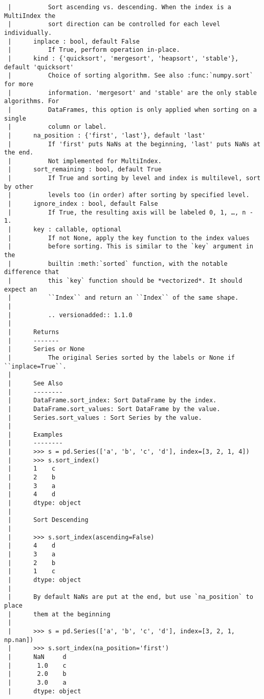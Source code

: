 \documentclass[
  letterpaper,
  DIV=11,
  numbers=noendperiod]{scrreprt}
\begin{document}
\begin{verbatim}
 |          Sort ascending vs. descending. When the index is a MultiIndex the
 |          sort direction can be controlled for each level individually.
 |      inplace : bool, default False
 |          If True, perform operation in-place.
 |      kind : {'quicksort', 'mergesort', 'heapsort', 'stable'}, default 'quicksort'
 |          Choice of sorting algorithm. See also :func:`numpy.sort` for more
 |          information. 'mergesort' and 'stable' are the only stable algorithms. For
 |          DataFrames, this option is only applied when sorting on a single
 |          column or label.
 |      na_position : {'first', 'last'}, default 'last'
 |          If 'first' puts NaNs at the beginning, 'last' puts NaNs at the end.
 |          Not implemented for MultiIndex.
 |      sort_remaining : bool, default True
 |          If True and sorting by level and index is multilevel, sort by other
 |          levels too (in order) after sorting by specified level.
 |      ignore_index : bool, default False
 |          If True, the resulting axis will be labeled 0, 1, …, n - 1.
 |      key : callable, optional
 |          If not None, apply the key function to the index values
 |          before sorting. This is similar to the `key` argument in the
 |          builtin :meth:`sorted` function, with the notable difference that
 |          this `key` function should be *vectorized*. It should expect an
 |          ``Index`` and return an ``Index`` of the same shape.
 |      
 |          .. versionadded:: 1.1.0
 |      
 |      Returns
 |      -------
 |      Series or None
 |          The original Series sorted by the labels or None if ``inplace=True``.
 |      
 |      See Also
 |      --------
 |      DataFrame.sort_index: Sort DataFrame by the index.
 |      DataFrame.sort_values: Sort DataFrame by the value.
 |      Series.sort_values : Sort Series by the value.
 |      
 |      Examples
 |      --------
 |      >>> s = pd.Series(['a', 'b', 'c', 'd'], index=[3, 2, 1, 4])
 |      >>> s.sort_index()
 |      1    c
 |      2    b
 |      3    a
 |      4    d
 |      dtype: object
 |      
 |      Sort Descending
 |      
 |      >>> s.sort_index(ascending=False)
 |      4    d
 |      3    a
 |      2    b
 |      1    c
 |      dtype: object
 |      
 |      By default NaNs are put at the end, but use `na_position` to place
 |      them at the beginning
 |      
 |      >>> s = pd.Series(['a', 'b', 'c', 'd'], index=[3, 2, 1, np.nan])
 |      >>> s.sort_index(na_position='first')
 |      NaN     d
 |       1.0    c
 |       2.0    b
 |       3.0    a
 |      dtype: object

\end{verbatim}
\end{document}
